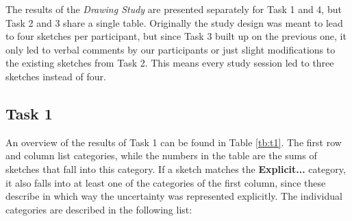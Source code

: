 The results of the \textit{Drawing Study} are presented separately for Task 1 and 4, but Task 2 and 3 share a single table. Originally the study design was meant to lead to four sketches per participant, but since Task 3 built up on the previous one, it only led to verbal comments by our participants or just slight modifications to the existing sketches from Task 2. This means every study session led to three sketches instead of four.

\subsection*{Task 1}
An overview of the results of Task 1 can be found in Table \ref{tb:t1}. The first row and column list categories, while the numbers in the table are the sums of sketches that fall into this category. If a sketch matches the \textbf{Explicit...} category, it also falls into at least one of the categories of the first column, since these describe in which way the uncertainty was represented explicitly. The individual categories are described in the following list:

